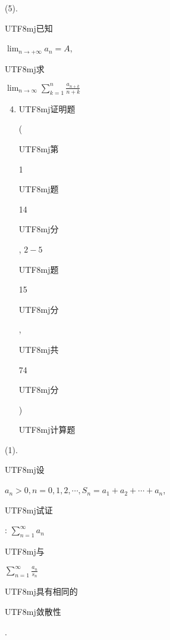 \documentclass[10pt]{article}
\begin{document}
(5). \begin{CJK}{UTF8}{mj}已知\end{CJK} $\lim _{n \rightarrow+\infty} a_{n}=A$, \begin{CJK}{UTF8}{mj}求\end{CJK} $\lim _{n \rightarrow \infty} \sum_{k=1}^{n} \frac{a_{n+k}}{n+k}$

\begin{enumerate}
  \setcounter{enumi}{3}
  \item \begin{CJK}{UTF8}{mj}证明题\end{CJK} (\begin{CJK}{UTF8}{mj}第\end{CJK} 1 \begin{CJK}{UTF8}{mj}题\end{CJK} 14 \begin{CJK}{UTF8}{mj}分\end{CJK}, $2-5$ \begin{CJK}{UTF8}{mj}题\end{CJK} 15 \begin{CJK}{UTF8}{mj}分\end{CJK}, \begin{CJK}{UTF8}{mj}共\end{CJK} 74 \begin{CJK}{UTF8}{mj}分\end{CJK}) \begin{CJK}{UTF8}{mj}计算题\end{CJK}
\end{enumerate}
(1). \begin{CJK}{UTF8}{mj}设\end{CJK} $a_{n}>0, n=0,1,2, \cdots, S_{n}=a_{1}+a_{2}+\cdots+a_{n}$, \begin{CJK}{UTF8}{mj}试证\end{CJK}: $\sum_{n=1}^{\infty} a_{n}$ \begin{CJK}{UTF8}{mj}与\end{CJK} $\sum_{n=1}^{\infty} \frac{a_{n}}{s_{n}}$ \begin{CJK}{UTF8}{mj}具有相同的\end{CJK} \begin{CJK}{UTF8}{mj}敛散性\end{CJK}.
\end{document}
